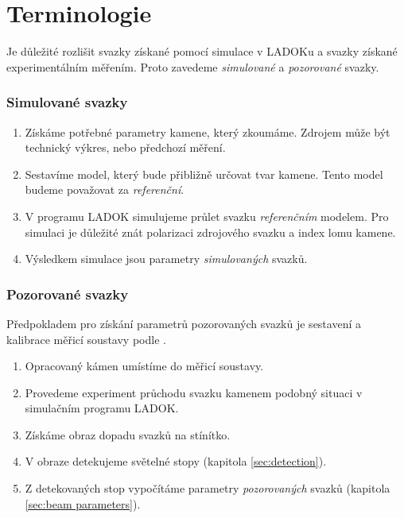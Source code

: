 \part{Terminologie}

Je důležité rozlišit svazky získané pomocí simulace v LADOKu a svazky získané experimentálním měřením.   
Proto zavedeme \textit{simulované} a \textit{pozorované} svazky.
\vspace{4mm}
\section{Simulované svazky}
\begin{enumerate}

\item 	Získáme potřebné parametry kamene, který zkoumáme. Zdrojem může být technický výkres, nebo předchozí měření.  

\item	Sestavíme model, který bude přibližně určovat tvar kamene. Tento model budeme považovat za \textit{referenční}.

\item	V programu LADOK simulujeme průlet svazku \textit{referenčním} modelem. Pro simulaci je důležité znát polarizaci zdrojového svazku a index lomu kamene. 

\item	Výsledkem simulace jsou parametry \textit{simulovaných} svazků.

\end{enumerate}

\section{Pozorované svazky}
Předpokladem pro získání parametrů pozorovaných svazků je sestavení a kalibrace měřicí soustavy podle \cite{Drapela}. %
\begin{enumerate}

\item 	Opracovaný kámen umístíme do měřicí soustavy.

\item	Provedeme experiment průchodu svazku kamenem podobný situaci v simulačním programu LADOK. 

\item	Získáme obraz dopadu svazků na stínítko. 

\item	V obraze detekujeme světelné stopy (kapitola \ref{sec:detection}).  

\item	Z detekovaných stop vypočítáme parametry \textit{pozorovaných} svazků (kapitola \ref{sec:beam parameters}).

\end{enumerate}

